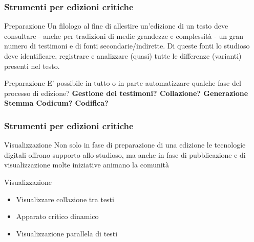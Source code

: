 \begin{frame}
	\frametitle{Strumenti per edizioni critiche}
	\addtocounter{nframe}{1}
    \begin{block}{Preparazione}
        Un filologo al fine di allestire un'edizione di un testo deve consultare - anche per tradizioni di medie grandezze e complessità - un gran numero di testimoni e di fonti secondarie/indirette. Di queste fonti lo studioso deve identificare, registrare e analizzare (quasi) tutte le differenze (varianti) presenti nel testo.
        
	\end{block}
	\begin{block}{Preparazione}
      E' possibile in tutto o in parte automatizzare qualche fase del processo di edizione? \textbf{Gestione dei testimoni? Collazione? Generazione Stemma Codicum? Codifica?}
	\end{block}
\end{frame}

\begin{frame}
    \frametitle{Strumenti per edizioni critiche}
    \addtocounter{nframe}{1}
    
    \begin{block}{Visualizzazione}
        Non solo in fase di preparazione di una edizione le tecnologie digitali offrono supporto allo studioso, ma anche in fase di pubblicazione e di visualizzazione molte iniziative animano la comunità
    \end{block}
    
    \begin{block}{Visualizzazione}
        \begin{itemize}
            \item Visualizzare collazione tra testi
            \item Apparato critico dinamico
            \item Visualizzazione parallela di testi
        \end{itemize}
    \end{block}

\end{frame}


